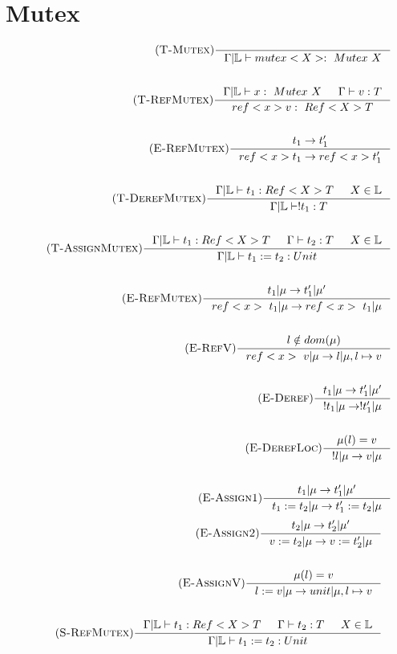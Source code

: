 \documentclass[12pt]{article}
\def\lock {\mathbb{L}}
\begin{document}
\section{Mutex}
\begin{align*}
    \tag {\textsc{T-Mutex}}
    \inference[]{
        }{\Gamma|\lock \vdash mutex<X> :~Mutex~X}
    \\
    \\
    \tag {\textsc{T-RefMutex}}
    \inference[]{\Gamma|\lock \vdash x :~Mutex~X & \Gamma \vdash v:T}{ref<x> v:~Ref<X>T}
    \\
    \\
    \tag {\textsc{E-RefMutex}}
    \inference[]{t_1->t_1'}{ref<x> t_1 -> ref<x> t_1'}
    \\
    \\
    \tag {\textsc{T-DerefMutex}}
    \inference[]{\Gamma|\lock \vdash t_1:Ref<X>T & X\in \lock}{\Gamma|\lock\vdash !t_1:T}
    \\
    \\
    \tag {\textsc{T-AssignMutex}}
    \inference[]{\Gamma|\lock \vdash t_1:Ref<X>T & \Gamma \vdash t_2:T & X\in \lock}{\Gamma|\lock\vdash t_1 := t_2:Unit}
    \\
    \\
    \tag {\textsc{E-RefMutex}}
    \inference[]{t_1|\mu->t_1'|\mu '}{ref<x>~t_1|\mu -> ref<x>~t_1|\mu}
    \\
    \\
    \tag {\textsc{E-RefV}}
    \inference[]{l\notin dom(\mu)}{ref<x>~v|\mu -> l|\mu,l\mapsto v}
    \\
    \\
    \tag {\textsc{E-Deref}}
    \inference[]{t_1|\mu->t_1'|\mu '}{!t_1|\mu -> !t_1'|\mu}
    \\
    \\
    \tag {\textsc{E-DerefLoc}}
    \inference[]{\mu(l)=v}{!l|\mu -> v|\mu}
    \\
    \\
    \tag {\textsc{E-Assign1}}
    \inference[]{t_1|\mu->t_1'|\mu '}{t_1:=t_2|\mu -> t_1':=t_2|\mu}
\end{align*}
\begin{align*}
    \tag {\textsc{E-Assign2}}
    \inference[]{t_2|\mu->t_2'|\mu '}{v:=t_2|\mu -> v:=t_2'|\mu}
    \\
    \\
    \tag {\textsc{E-AssignV}}
    \inference[]{\mu(l)=v}{l:=v|\mu -> unit|\mu,l\mapsto v}
    \\
    \\
    \tag {\textsc{S-RefMutex}}
    \inference[]{\Gamma|\lock \vdash t_1:Ref<X>T & \Gamma \vdash t_2:T & X\in \lock}{\Gamma|\lock\vdash t_1 := t_2:Unit}
\end{align*}
\end{document}
